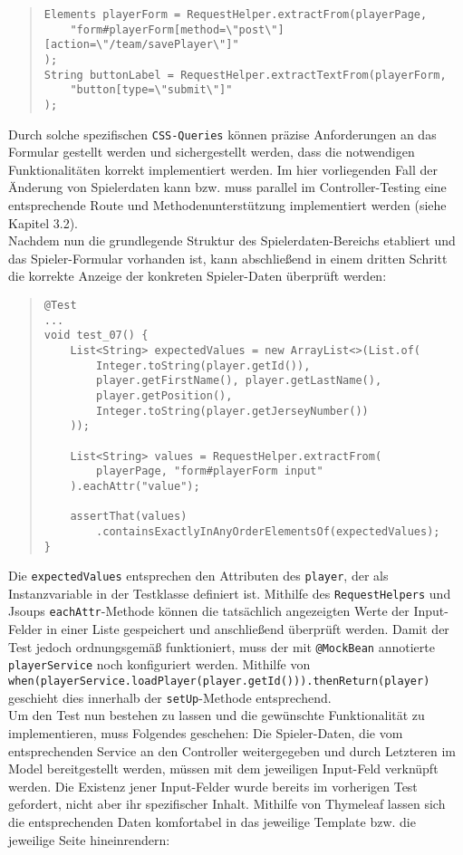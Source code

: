 \begin{quote}
\begin{verbatim}
Elements playerForm = RequestHelper.extractFrom(playerPage, 
    "form#playerForm[method=\"post\"][action=\"/team/savePlayer\"]"
);
String buttonLabel = RequestHelper.extractTextFrom(playerForm, 
    "button[type=\"submit\"]"
);
\end{verbatim}
\end{quote}

Durch solche spezifischen \texttt{CSS-Queries} können präzise Anforderungen an das 
Formular gestellt werden und sichergestellt werden, dass die notwendigen 
Funktionalitäten korrekt implementiert werden. Im hier vorliegenden Fall der 
Änderung von Spielerdaten kann bzw. muss parallel im Controller-Testing eine 
entsprechende Route und Methodenunterstützung implementiert werden (siehe Kapitel 
3.2). \\ 
Nachdem nun die grundlegende Struktur des Spielerdaten-Bereichs etabliert und das 
Spieler-Formular vorhanden ist, kann abschließend in einem dritten Schritt die 
korrekte Anzeige der konkreten Spieler-Daten überprüft werden: 

\begin{quote}
\begin{verbatim}
@Test
...
void test_07() {
    List<String> expectedValues = new ArrayList<>(List.of(
        Integer.toString(player.getId()), 
        player.getFirstName(), player.getLastName(), 
        player.getPosition(), 
        Integer.toString(player.getJerseyNumber())
    ));

    List<String> values = RequestHelper.extractFrom(
        playerPage, "form#playerForm input"
    ).eachAttr("value");

    assertThat(values)
        .containsExactlyInAnyOrderElementsOf(expectedValues);
}
\end{verbatim}
\end{quote}

Die \texttt{expectedValues} entsprechen den Attributen des \texttt{player}, der als 
Instanzvariable in der Testklasse definiert ist. Mithilfe des 
\texttt{RequestHelpers} und Jsoups \texttt{eachAttr}-Methode können die tatsächlich 
angezeigten Werte der Input-Felder in einer Liste gespeichert und anschließend 
überprüft werden. Damit der Test jedoch ordnungsgemäß funktioniert, muss der mit 
\texttt{@MockBean} annotierte \texttt{playerService} noch konfiguriert werden. 
Mithilfe von 
\texttt{when(playerService.loadPlayer(player.getId())).thenReturn(player)} 
geschieht dies innerhalb der \texttt{setUp}-Methode entsprechend. \\ 
Um den Test nun bestehen zu lassen und die gewünschte Funktionalität zu 
implementieren, muss Folgendes geschehen: Die Spieler-Daten, die vom 
entsprechenden Service an den Controller weitergegeben und durch Letzteren im 
Model bereitgestellt werden, müssen mit dem jeweiligen Input-Feld verknüpft werden. 
Die Existenz jener Input-Felder wurde bereits im vorherigen Test gefordert, nicht 
aber ihr spezifischer Inhalt. Mithilfe von Thymeleaf lassen sich die entsprechenden 
Daten komfortabel in das jeweilige Template bzw. die jeweilige Seite hineinrendern: 

